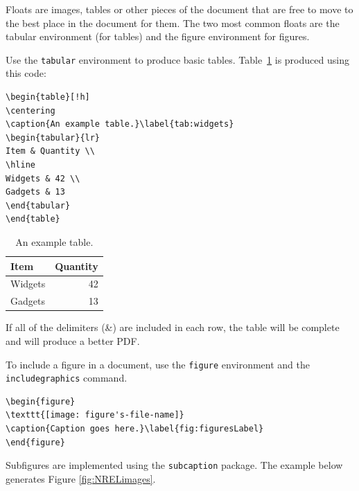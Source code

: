 Floats are images, tables or other pieces of the document that are free to move to the best place in the document for them. The two most common floats are the tabular environment (for tables) and the figure environment for figures.

Use the \texttt{tabular} environment to produce basic tables. Table~\ref{tab:widgets} is produced using this code: 

\begin{lstlisting}
\begin{table}[!h]
\centering
\caption{An example table.}\label{tab:widgets}
\begin{tabular}{lr}
Item & Quantity \\
\hline
Widgets & 42 \\
Gadgets & 13
\end{tabular}
\end{table}
\end{lstlisting}

\begin{table}[!h]
\centering
\caption{An example table.}\label{tab:widgets}
\begin{tabular}{lr}
Item & Quantity \\
\hline
Widgets & 42 \\
Gadgets & 13
\end{tabular}
\end{table}

If all of the delimiters (\&) are included in each row, the table will be complete and will produce a better PDF.

To include a figure in a document, use the \texttt{figure} environment and the \texttt{includegraphics} command.

\begin{lstlisting}
\begin{figure}
\texttt{[image: figure's-file-name]}
\caption{Caption goes here.}\label{fig:figuresLabel}
\end{figure}
\end{lstlisting}

Subfigures are implemented using the \texttt{subcaption} package. The example below generates Figure \ref{fig:NRELimages}.


